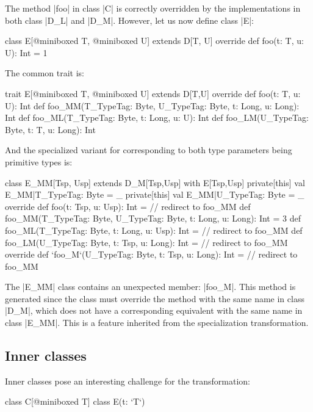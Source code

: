 The method |foo| in class |C| is correctly overridden by the implementations in both class |D_L| and |D_M|.
However, let us now define class |E|:

\begin{lstlisting-nobreak}
class E[@miniboxed T, @miniboxed U] extends D[T, U] {
  override def foo(t: T, u: U): Int = 1
}
\end{lstlisting-nobreak}

The common trait is:

\begin{lstlisting-nobreak}
trait E[@miniboxed T, @miniboxed U] extends D[T,U] {
  override def foo(t: T, u: U): Int
  def foo_MM(T_TypeTag: Byte, U_TypeTag: Byte, t: Long, u: Long): Int
  def foo_ML(T_TypeTag: Byte, t: Long, u: U): Int
  def foo_LM(U_TypeTag: Byte, t: T, u: Long): Int
}
\end{lstlisting-nobreak}

And the specialized variant for corresponding to both type parameters being primitive types is:

\begin{lstlisting-nobreak}
class E_MM[Tsp, Usp] extends D_M[Tsp,Usp] with E[Tsp,Usp] {
  private[this] val E_MM|T_TypeTag: Byte = _
  private[this] val E_MM|U_TypeTag: Byte = _
  override def foo(t: Tsp, u: Usp): Int = // redirect to foo_MM
  def foo_MM(T_TypeTag: Byte, U_TypeTag: Byte, t: Long, u: Long): Int = 3
  def foo_ML(T_TypeTag: Byte, t: Long, u: Usp): Int = // redirect to foo_MM
  def foo_LM(U_TypeTag: Byte, t: Tsp, u: Long): Int = // redirect to foo_MM
  override def `foo_M`(U_TypeTag: Byte, t: Tsp, u: Long): Int = // redirect to foo_MM
}
\end{lstlisting-nobreak}

The |E_MM| class contains an unexpected member: |foo_M|. This method is generated since the class must override the method with the same name in class |D_M|, which does not have a corresponding equivalent with the same name in class |E_MM|. This is a feature inherited from the specialization transformation.

\subsection{Inner classes}

Inner classes pose an interesting challenge for the transformation:

\begin{lstlisting-nobreak}
class C[@miniboxed T] {
  class E(t: `T`)
}
\end{lstlisting-nobreak}

